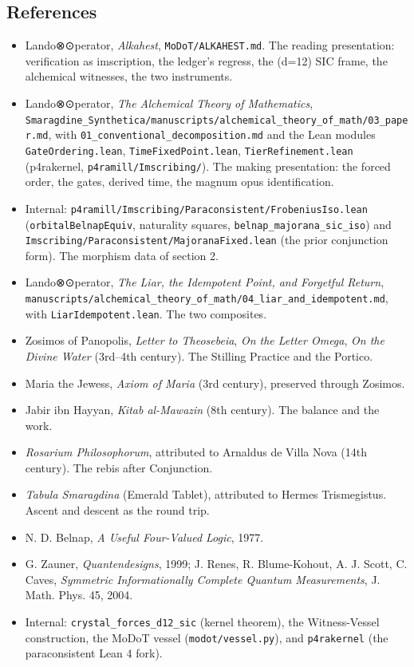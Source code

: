 \documentclass[12pt,a4paper]{article}
\begin{document}
\hypertarget{references}{%
\subsection{References}\label{references}}

\begin{itemize}
\tightlist
\item
  Lando⊗⊙perator, \emph{Alkahest}, \texttt{MoDoT/ALKAHEST.md}. The
  reading presentation: verification as imscription, the ledger's
  regress, the (d=12) SIC frame, the alchemical witnesses, the two
  instruments.
\item
  Lando⊗⊙perator, \emph{The Alchemical Theory of Mathematics},
  \texttt{Smaragdine\_Synthetica/manuscripts/alchemical\_theory\_of\_math/03\_paper.md},
  with \texttt{01\_conventional\_decomposition.md} and the Lean modules
  \texttt{GateOrdering.lean}, \texttt{TimeFixedPoint.lean},
  \texttt{TierRefinement.lean} (p4rakernel,
  \texttt{p4ramill/Imscribing/}). The making presentation: the forced
  order, the gates, derived time, the magnum opus identification.
\item
  Internal:
  \texttt{p4ramill/Imscribing/Paraconsistent/FrobeniusIso.lean}
  (\texttt{orbitalBelnapEquiv}, naturality squares,
  \texttt{belnap\_majorana\_sic\_iso}) and
  \texttt{Imscribing/Paraconsistent/MajoranaFixed.lean} (the prior
  conjunction form). The morphism data of section 2.
\item
  Lando⊗⊙perator, \emph{The Liar, the Idempotent Point, and Forgetful
  Return},
  \texttt{manuscripts/alchemical\_theory\_of\_math/04\_liar\_and\_idempotent.md},
  with \texttt{LiarIdempotent.lean}. The two composites.
\item
  Zosimos of Panopolis, \emph{Letter to Theosebeia}, \emph{On the Letter
  Omega}, \emph{On the Divine Water} (3rd--4th century). The Stilling
  Practice and the Portico.
\item
  Maria the Jewess, \emph{Axiom of Maria} (3rd century), preserved
  through Zosimos.
\item
  Jabir ibn Hayyan, \emph{Kitab al-Mawazin} (8th century). The balance
  and the work.
\item
  \emph{Rosarium Philosophorum}, attributed to Arnaldus de Villa Nova
  (14th century). The rebis after Conjunction.
\item
  \emph{Tabula Smaragdina} (Emerald Tablet), attributed to Hermes
  Trismegistus. Ascent and descent as the round trip.
\item
  N. D. Belnap, \emph{A Useful Four-Valued Logic}, 1977.
\item
  G. Zauner, \emph{Quantendesigns}, 1999; J. Renes, R. Blume-Kohout, A.
  J. Scott, C. Caves, \emph{Symmetric Informationally Complete Quantum
  Measurements}, J. Math. Phys. 45, 2004.
\item
  Internal: \texttt{crystal\_forces\_d12\_sic} (kernel theorem), the
  Witness-Vessel construction, the MoDoT vessel
  (\texttt{modot/vessel.py}), and \texttt{p4rakernel} (the
  paraconsistent Lean 4 fork).
\end{itemize}
\end{document}
